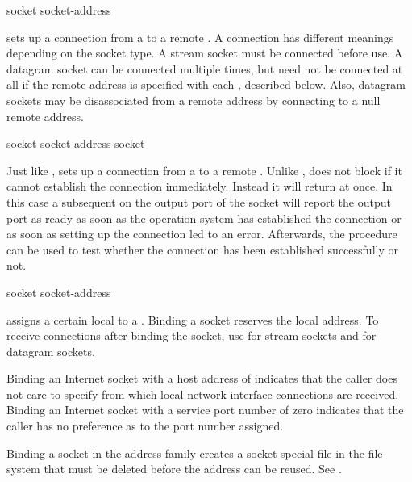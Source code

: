  {socket socket-address} \undefined
\begin{desc}
 sets up a connection from a 
to a remote . A connection has different meanings
depending on the socket type. A stream socket must be connected before
use. A datagram socket can be connected multiple times, but need not be
connected at all if the remote address is specified with each
, described below. Also, datagram sockets
may be disassociated from a remote address by connecting to a null
remote address.
\end{desc}
 {socket socket-address} \boolean
{} {socket} \boolean
\begin{desc}
  Just like ,  sets up a
  connection from a  to a remote .
  Unlike ,  does not
  block if it cannot establish the connection immediately. Instead it
  will return \sharpf{} at once. In this case a subsequent  on
  the output port of the socket will report the output port as ready
  as soon as the operation system has established the connection or as
  soon as setting up the connection led to an error. Afterwards, the
  procedure  can be used to test
  whether the connection has been established successfully or not.
\end{desc}
 {socket socket-address} \undefined
\begin{desc}
 assigns a certain local  to a
. Binding a socket reserves the local address. To receive
connections after binding the socket, use  for stream
sockets and  for datagram sockets.

Binding an Internet socket with a host address of
 indicates that the caller does
not care to specify from which local network interface connections are
received. Binding an Internet socket with a service port number of zero
indicates that the caller has no preference as to the port number
assigned.

Binding a socket in the {\Unix} address family creates a socket special
file in the file system that must be deleted before the address can be
reused. See .
\end{desc}

